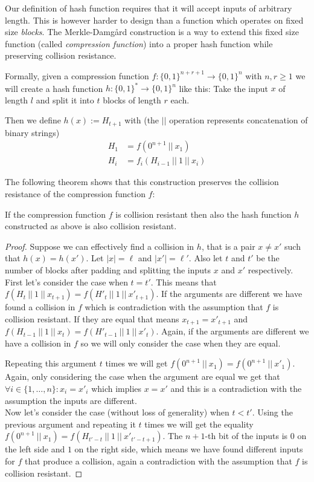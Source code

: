 Our definition of hash function requires that it will accept inputs of arbitrary length.
This is however harder to design than a function which operates on fixed size \emph{blocks}.
The Merkle-Damg\aa rd construction \citep{merkle1979secrecy,damgaard1990design} is a way to extend this fixed size function (called \emph{compression function}) into a proper hash function while preserving collision resistance.

Formally, given a compression function $f: \{0,1\}^{n+r+1} \to \{0,1\}^n$ with $n,r \ge 1$ we will create a hash function $h: \{0,1\}^* \to \{0,1\}^n$ like this: Take the input $x$ of length $l$ and split it into $t$ blocks of length $r$ each.

Then we define $h(x) := H_{t+1}$ with (the $||$ operation represents concatenation of binary strings)
\begin{align*}
H_1 &= f(0^{n+1} ~||~ x_1) \\
H_i &= f_i(H_{i-1} ~||~ 1 ~||~ x_i)
\end{align*}

The following theorem shows that this construction preserves the collision resistance of the compression function $f$:

\begin{theorem}
If the compression function $f$ is collision resistant then also the hash function $h$ constructed as above is also collision resistant.
\end{theorem}
\begin{proof}
Suppose we can effectively find a collision in $h$, that is a pair $x \neq x'$ such that $h(x) = h(x')$.
Let $|x| = \ell$ and $|x'| = \ell'$.
Also let $t$ and $t'$ be the number of blocks after padding and splitting the inputs $x$ and $x'$ respectively.
\\

First let's consider the case when $t = t'$.
This means that $f(H_t ~||~ 1 ~||~ x_{t+1}) = f(H'_t ~||~ 1 ~||~ x'_{t+1})$. 
If the arguments are different we have found a collision in $f$ which is contradiction with the assumption that $f$ is collision resistant.
If they are equal that means $x_{t+1} = x'_{t+1}$ and $f(H_{t-1} ~||~ 1 ~||~ x_t) = f(H'_{t-1} ~||~ 1 ~||~ x'_t)$.
Again, if the arguments are different we have a collision in $f$ so we will only consider the case when they are equal.

Repeating this argument $t$ times we will get $f(0^{n+1} ~||~ x_1) = f(0^{n+1} ~||~ x'_1)$.
Again, only considering the case when the argument are equal we get that $\forall i \in \{1,\ldots,n\}: x_i = x'_i$ which implies $x = x'$ and this is a contradiction with the assumption the inputs are different.
\\

Now let's consider the case (without loss of generality) when $t < t'$.
Using the previous argument and repeating it $t$ times we will get the equality $f(0^{n+1} ~||~ x_1) = f(H_{t'-t} ~||~ 1 ~||~ x'_{t'-t+1})$.
The $n+1$-th bit of the inputs is $0$ on the left side and $1$ on the right side, which means we have found different inputs for $f$ that produce a collision, again a contradiction with the assumption that $f$ is collision resistant. 
\end{proof}

